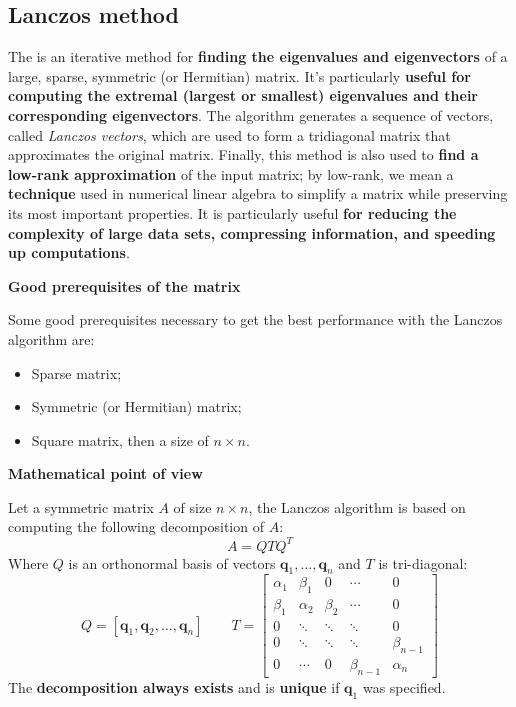 \subsection{Lanczos method}

The  is an iterative method for \textbf{finding the eigenvalues and eigenvectors} of a large, sparse, symmetric (or Hermitian) matrix. It's particularly \textbf{useful for computing the extremal (largest or smallest) eigenvalues and their corresponding eigenvectors}. The algorithm generates a sequence of vectors, called \emph{Lanczos vectors}, which are used to form a tridiagonal matrix that approximates the original matrix. Finally, this method is also used to \textbf{find a low-rank approximation} of the input matrix; by low-rank, we mean a \textbf{technique} used in numerical linear algebra to simplify a matrix while preserving its most important properties. It is particularly useful \textbf{for reducing the complexity of large data sets, compressing information, and speeding up computations}.

\begin{flushleft}
    \textcolor{Green3}{ \textbf{Good prerequisites of the matrix}}
\end{flushleft}
Some good prerequisites necessary to get the best performance with the Lanczos algorithm are:
\begin{itemize}
    \item Sparse matrix;
    \item Symmetric (or Hermitian) matrix;
    \item Square matrix, then a size of $n \times n$.
\end{itemize}

\highspace
\begin{flushleft}
    \textcolor{Green3}{ \textbf{Mathematical point of view}}
\end{flushleft}
Let a symmetric matrix $A$ of size $n \times n$, the Lanczos algorithm is based on computing the following decomposition of $A$:
\begin{equation}
    A = QTQ^{T}
\end{equation}
Where $Q$ is an orthonormal basis of vectors $\mathbf{q}_{1}, \dots, \mathbf{q}_{n}$ and $T$ is tri-diagonal:
\begin{equation*}
    Q = \left[\mathbf{q}_{1}, \mathbf{q}_{2}, \dots, \mathbf{q}_{n}\right] \hspace{2em} T = \begin{bmatrix}
        \alpha_{1} & \beta_{1} & 0 & \cdots & 0 \\
        \beta_{1} & \alpha_{2} & \beta_{2} & \cdots & 0 \\
        0 & \ddots & \ddots & \ddots & 0 \\
        0 & \ddots & \ddots & \ddots & \beta_{n-1} \\
        0 & \cdots & 0 & \beta_{n-1} & \alpha_{n}
    \end{bmatrix}
\end{equation*}
The \textbf{decomposition always exists} and is \textbf{unique} if $\mathbf{q}_{1}$ was specified. 

